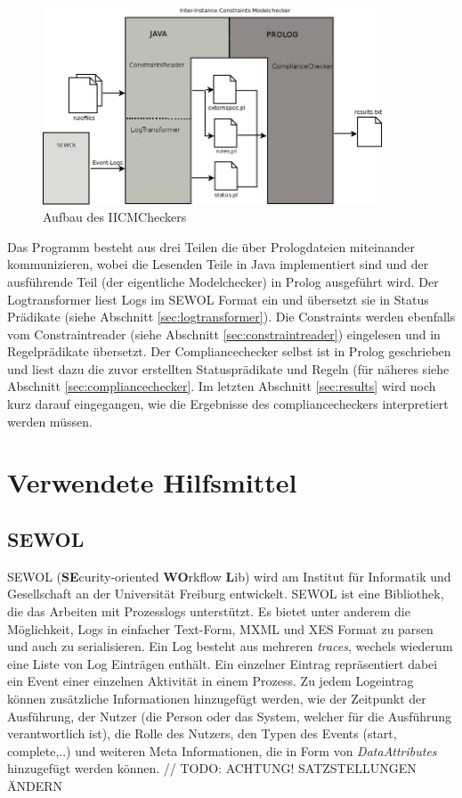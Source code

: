 \begin{figure}[ht]
	\centering
  \includegraphics[width=0.9\textwidth]{Figures/Programm}
	\caption{Aufbau des IICMCheckers}
	\label{fig:myprog}
\end{figure}
Das Programm besteht aus drei Teilen die über Prologdateien miteinander kommunizieren, wobei die Lesenden Teile in Java implementiert sind und der ausführende Teil (der eigentliche Modelchecker) in Prolog ausgeführt wird.
Der Logtransformer liest Logs im SEWOL \cite{SEWOL} Format ein und übersetzt sie in Status Prädikate (siehe Abschnitt \ref{sec:logtransformer}). 
Die Constraints werden ebenfalls vom Constraintreader (siehe Abschnitt \ref{sec:constraintreader}) eingelesen und in Regelprädikate übersetzt.
Der Compliancechecker selbst ist in Prolog geschrieben und liest dazu die zuvor erstellten Statusprädikate und Regeln (für näheres siehe Abschnitt \ref{sec:compliancechecker}. Im letzten Abschnitt \ref{sec:results} wird noch kurz darauf eingegangen, wie die Ergebnisse des compliancecheckers interpretiert werden müssen.

\section{Verwendete Hilfsmittel}
\subsection{SEWOL}
SEWOL (\textbf{SE}curity-oriented \textbf{WO}rkflow \textbf{L}ib) wird am Institut für Informatik und Gesellschaft an der Universität Freiburg entwickelt. SEWOL ist eine Bibliothek, die das Arbeiten mit Prozesslogs unterstützt. Es bietet unter anderem die Möglichkeit, Logs in einfacher Text-Form, MXML und XES Format zu parsen und auch zu serialisieren. Ein Log besteht aus mehreren \textit{traces}, wechels wiederum eine Liste von Log Einträgen enthält. Ein einzelner Eintrag repräsentiert dabei ein Event einer einzelnen Aktivität in einem Prozess. Zu jedem Logeintrag können zusätzliche Informationen hinzugefügt werden, wie der Zeitpunkt der Ausführung, der Nutzer (die Person oder das System, welcher für die Ausführung verantwortlich ist), die Rolle des Nutzers, den Typen des Events (start, complete,..) und weiteren Meta Informationen, die in Form von \textit{DataAttributes} hinzugefügt werden können. \cite{SEWOL} // TODO: ACHTUNG! SATZSTELLUNGEN ÄNDERN

